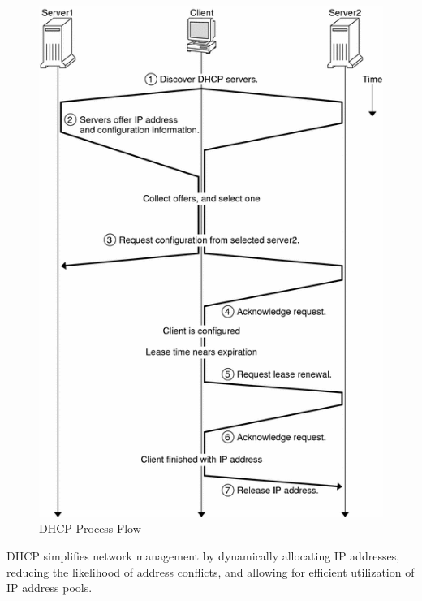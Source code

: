 \begin{figure}[H]
    \centering
    \includegraphics[scale=0.4]{assets/dhcp.png}
    \caption{DHCP Process Flow}
    \label{fig:dhcp_process}
\end{figure}

DHCP simplifies network management by dynamically allocating IP addresses, reducing the likelihood of address conflicts, and allowing for efficient utilization of IP address pools.
